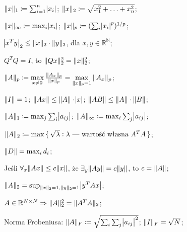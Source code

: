 

\entry
$\|x\|_1 \coloneqq \sum^n_{i=1}\abs{x_i}$;
\entry
$\|x\|_2 \coloneqq \sqrt{x_1^2+\ldots + x_n^2}$;

\entry
$\|x\|_\infty \coloneqq \max_{i}\abs{x_i}$;
\entry
$\|x\|_p \coloneqq (\sum_i\abs{x_i}^p)^{1/p}$;

\entry
$\abs{x^Ty}_2 \leq \|x\|_2\cdot\|y\|_2$, dla $x,y\in\mathbb{R^N}$;

\entry
$Q^TQ=I$, to $\|Qx\|^2_2=\|x\|^2_2$;


\entry
$\|A\|_p \coloneqq \max\limits_{x\neq 0} \frac{\|A_x\|_p}{\|x\|_p} = \max\limits_{\|x\|_p = 1} \|A_x\|_p$;

\entry
$\|I\| = 1$;
\entry
$\|Ax\| \leq \|A\| \cdot \abs{x}$;
\entry
$\|AB\| \leq \|A\| \cdot \|B\|$;

\entry
$\|A\|_1 \coloneqq \max_j\sum_i\abs{a_{ij}}$;
\entry
$\|A\|_\infty \coloneqq \max_i\sum_j\abs{a_{ij}}$;

\entry
$\|A\|_2 \coloneqq \max\set{\sqrt{\lambda} : \lambda\text{ --- wartość własna } A^TA}$;

\entry
$\|D\| = \max_i d_i$;

\entry
Jeśli $\forall_{x} \|Ax\|\leq c\|x\|$, że $\exists_y \|Ay\| = c\|y\|$, to $c=\|A\|$;

\entry
$\|A\|_2 = \sup_{\|x\|_2=1, \|y\|_2=1}\abs{y^TAx}$;

\entry
$A\in\mathbb{R}^{N\times N} \Rightarrow \|A\|^2_2=\|A^TA\|_2$;


\entry
Norma Frobeniusa: $\|A\|_F \coloneqq \sqrt{\sum_i\sum_j\abs{a_{ij}}^2}$; $\|I\|_F=\sqrt{N}$;



